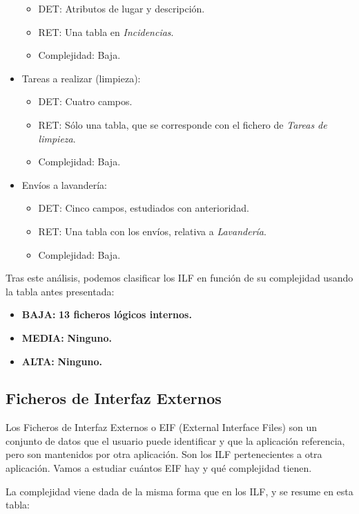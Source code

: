 \documentclass[spanish,a4paper,12pt]{report}	%
\begin{document}
\begin{itemize}
\begin{itemize}
 			\item{DET:} Atributos de lugar y descripción.
			\item{RET:} Una tabla en \textit{Incidencias}.
			\item{Complejidad:} Baja.
		\end{itemize}
		\item{Tareas a realizar (limpieza):} 
		\begin{itemize}
 			\item{DET:} Cuatro campos.
			\item{RET:} Sólo una tabla, que se corresponde con el fichero de \textit{Tareas de limpieza}.
			\item{Complejidad:} Baja.
		\end{itemize}
		\item{Envíos a lavandería:} 
		\begin{itemize}
 			\item{DET:} Cinco campos, estudiados con anterioridad.
			\item{RET:} Una tabla con los envíos, relativa a \textit{Lavandería}.
			\item{Complejidad:} Baja.
		\end{itemize}
	\end{itemize}

	Tras este análisis, podemos clasificar los ILF en función de su complejidad usando la tabla antes presentada:
	\begin{itemize}
	\item{\textbf{BAJA:}} \textbf{13 ficheros lógicos internos.}
	\item{\textbf{MEDIA:}} \textbf{Ninguno.}
	\item{\textbf{ALTA:}} \textbf{Ninguno.}
	\end{itemize}

	\subsection{Ficheros de Interfaz Externos}
		Los Ficheros de Interfaz Externos o EIF (External Interface Files) son un conjunto de datos que el usuario puede identificar y que la aplicación referencia, pero son mantenidos por otra aplicación. Son los ILF pertenecientes a otra aplicación. Vamos a estudiar cuántos EIF hay y qué complejidad tienen. 

	La complejidad viene dada de la misma forma que en los ILF, y se resume en esta tabla: 

\vspace{0.35cm}
\end{document}
